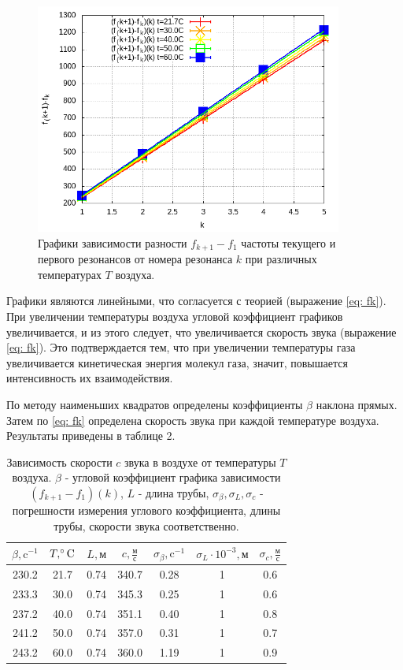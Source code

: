 \begin{figure} [h]
    \label{figure4}
    \includegraphics[width=0.9\textwidth]{img/graph8.png}

    \caption{Графики зависимости разности $f_{k+1} - f_1$ частоты текущего и первого резонансов от номера резонанса $k$ при различных температурах $T$ воздуха.}
    
\end{figure}
\newpage
Графики являются линейными, что согласуется с теорией (выражение \eqref{eq: fk}). При увеличении температуры воздуха угловой коэффициент графиков увеличивается, и из этого следует, что увеличивается скорость звука (выражение \eqref{eq: fk}). Это подтверждается тем, что при увеличении температуры газа увеличивается кинетическая энергия молекул газа, значит, повышается интенсивность их взаимодействия.

По методу наименьших квадратов определены коэффициенты $\beta$ наклона прямых. Затем по \eqref{eq: fk} определена скорость звука при каждой температуре воздуха. Результаты приведены в таблице 2.

\begin{table}[h]
    \centering
    \begin{tabular}{|c|c|c|c|c|c|c|}
    \hline
    $\beta, \text{c}^{-1}$ & $T, \celsius$ & $L, \text{м}$ & $c, \frac{\text{м}}{\text{с}}$ & $\sigma_\beta, \text{c}^{-1}$ & $\sigma_L\cdot 10^{-3}, \text{м}$ & $\sigma_c, \frac{\text{м}}{\text{с}}$ \\ \hline
    230.2   & 21.7 & 0.74 & 340.7 & 0.28 & 1 & 0.6 \\ \hline
    233.3   & 30.0 & 0.74 & 345.3 & 0.25 & 1 & 0.6 \\ \hline
    237.2   & 40.0 & 0.74 & 351.1 & 0.40 & 1 & 0.8 \\ \hline
    241.2   & 50.0 & 0.74 & 357.0 & 0.31 & 1 & 0.7 \\ \hline
    243.2   & 60.0 & 0.74 & 360.0 & 1.19 & 1 & 0.9 \\ \hline
\end{tabular}
    \caption{Зависимость скорости $c$ звука в воздухе от температуры $T$ воздуха. $\beta$ - угловой коэффициент графика зависимости $(f_{k+1} - f_1)(k)$, $L$ - длина трубы, $\sigma_\beta, \sigma_L, \sigma_c$ - погрешности измерения углового коэффициента, длины трубы, скорости звука соответственно.}
    \label{tab:t10}
\end{table}

